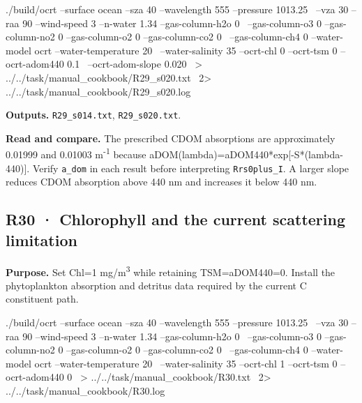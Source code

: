 \noindent\begin{minipage}{\linewidth}
\begin{ManualCode}

./build/ocrt --surface ocean --sza 40 --wavelength 555 --pressure 1013.25 \
  --vza 30 --raa 90 --wind-speed 3 --n-water 1.34 --gas-column-h2o 0 \
  --gas-column-o3 0 --gas-column-no2 0 --gas-column-o2 0 --gas-column-co2 0 \
  --gas-column-ch4 0 --water-model ocrt --water-temperature 20 \
  --water-salinity 35 --ocrt-chl 0 --ocrt-tsm 0 --ocrt-adom440 0.1 \
  --ocrt-adom-slope 0.020 \
  > ../../task/manual_cookbook/R29_s020.txt \
  2> ../../task/manual_cookbook/R29_s020.log

\end{ManualCode}
\end{minipage}\par

\textbf{Outputs. }\texttt{R29\_\allowbreak{}s014.txt}, \texttt{R29\_\allowbreak{}s020.txt}.

\textbf{Read and compare. }The prescribed CDOM absorptions are approximately 0.01999 and 0.01003 m\textsuperscript{-1} because aDOM(lambda)=aDOM440*exp[-S*(lambda-440)]. Verify \texttt{a\_\allowbreak{}dom} in each result before interpreting \texttt{Rrs0plus\_\allowbreak{}I}. A larger slope reduces CDOM absorption above 440 nm and increases it below 440 nm.


\subsection{R30 · Chlorophyll and the current scattering limitation}
\label{sec:auto:09_cookbook:6.5}

\label{recipe:R30}

\textbf{Purpose. }Set Chl=1 mg/m\textsuperscript{3} while retaining TSM=aDOM440=0. Install the phytoplankton absorption and detritus data required by the current C constituent path.

\noindent\begin{minipage}{\linewidth}
\begin{ManualCode}

./build/ocrt --surface ocean --sza 40 --wavelength 555 --pressure 1013.25 \
  --vza 30 --raa 90 --wind-speed 3 --n-water 1.34 --gas-column-h2o 0 \
  --gas-column-o3 0 --gas-column-no2 0 --gas-column-o2 0 --gas-column-co2 0 \
  --gas-column-ch4 0 --water-model ocrt --water-temperature 20 \
  --water-salinity 35 --ocrt-chl 1 --ocrt-tsm 0 --ocrt-adom440 0 \
  > ../../task/manual_cookbook/R30.txt \
  2> ../../task/manual_cookbook/R30.log

\end{ManualCode}
\end{minipage}\par

